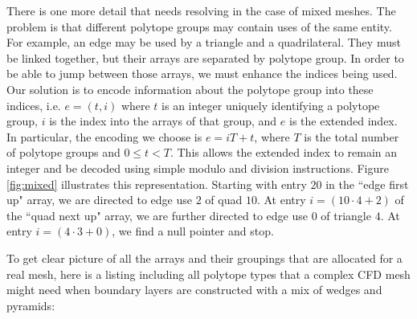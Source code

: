 There is one more detail that needs resolving in the
case of mixed meshes.
The problem is that different polytope
groups may contain uses of the same entity.
For example, an edge may be used by a triangle and a quadrilateral.
They must be linked together, but their arrays are
separated by polytope group.
In order to be able to jump between those arrays, we must
enhance the indices being used.
Our solution is to encode information about the polytope group
into these indices, i.e. $e = (t,i)$ where $t$ is an integer
uniquely identifying a polytope group, $i$ is the index
into the arrays of that group, and $e$ is the extended index.
In particular, the encoding we choose is $e = iT + t$, where
$T$ is the total number of polytope groups and $0\leq t < T$.
This allows the extended index to remain an integer
and be decoded using simple modulo and division instructions.
Figure \ref{fig:mixed} illustrates this representation.
Starting with entry $20$ in the ``edge first up" array,
we are directed to edge use $2$ of quad $10$.
At entry $i=(10\cdot 4 + 2)$ of the ``quad next up" array,
we are further directed to edge use $0$ of triangle $4$.
At entry $i=(4\cdot 3 + 0)$, we find a null pointer and stop.

To get clear picture of all the arrays and their groupings
that are allocated for a real mesh, here is a listing
including all polytope types that a complex CFD mesh
might need when boundary layers are constructed with
a mix of wedges and pyramids:

